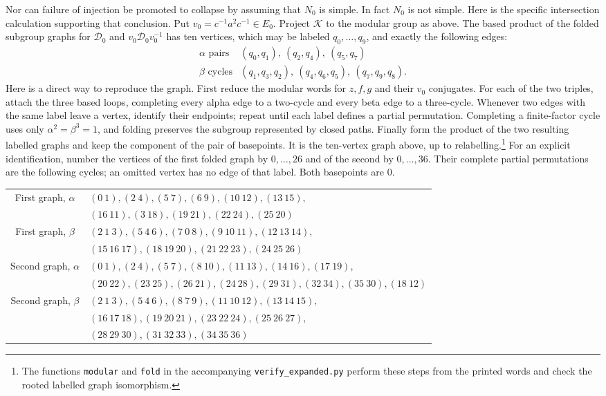 \documentclass[11pt]{amsart}
\theoremstyle{definition}
\theoremstyle{remark}
\begin{document}
Nor can failure of injection be promoted to collapse by assuming that
$N_0$ is simple. In fact $N_0$ is not simple. Here is the specific
intersection calculation supporting that conclusion. Put
$v_0=c^{-1}a^2c^{-1}\in E_0$. Project $\mathcal K$ to the modular
group as above. The based product of the folded subgroup graphs for
$\mathcal D_0$ and $v_0\mathcal D_0v_0^{-1}$ has ten vertices,
which may be labeled $q_0,\ldots,q_9$, and exactly the following edges:
\[
\begin{array}{c|l}
\alpha\text{ pairs}&(q_0,q_1),\ (q_2,q_4),\ (q_5,q_7)\\
\beta\text{ cycles}&(q_1,q_3,q_2),\ (q_4,q_6,q_5),\ (q_7,q_9,q_8).
\end{array}
\]
Here is a direct way to reproduce the graph. First reduce the modular
words for $z,f,g$ and their $v_0$ conjugates. For each of the two
triples, attach the three based loops, completing every alpha edge
to a two-cycle and every beta edge to a three-cycle. Whenever two
edges with the same label leave a vertex, identify their endpoints;
repeat until each label defines a partial permutation. Completing a
finite-factor cycle uses only $\alpha^2=\beta^3=1$, and folding
preserves the subgroup represented by closed paths. Finally form the
product of the two resulting labelled graphs and keep the component
of the pair of basepoints. It is the ten-vertex graph above, up to
relabelling.\footnote{The functions \texttt{modular} and \texttt{fold}
in the accompanying \texttt{verify\_expanded.py} perform these steps
from the printed words and check the rooted labelled graph isomorphism.}
For an explicit identification, number the vertices of the first folded
graph by $0,\ldots,26$ and of the second by $0,\ldots,36$.
Their complete partial permutations are the following cycles; an omitted
vertex has no edge of that label. Both basepoints are $0$.
\begin{center}
\begin{adjustbox}{max width=\textwidth}
\begin{tabular}{cl}
\toprule
First graph, $\alpha$&$(0\ 1),(2\ 4),(5\ 7),(6\ 9),(10\ 12),(13\ 15),$\\
&$(16\ 11),(3\ 18),(19\ 21),(22\ 24),(25\ 20)$\\
First graph, $\beta$&$(2\ 1\ 3),(5\ 4\ 6),(7\ 0\ 8),(9\ 10\ 11),(12\ 13\ 14),$\\
&$(15\ 16\ 17),(18\ 19\ 20),(21\ 22\ 23),(24\ 25\ 26)$\\
Second graph, $\alpha$&$(0\ 1),(2\ 4),(5\ 7),(8\ 10),(11\ 13),(14\ 16),(17\ 19),$\\
&$(20\ 22),(23\ 25),(26\ 21),(24\ 28),(29\ 31),(32\ 34),(35\ 30),(18\ 12)$\\
Second graph, $\beta$&$(2\ 1\ 3),(5\ 4\ 6),(8\ 7\ 9),(11\ 10\ 12),(13\ 14\ 15),$\\
&$(16\ 17\ 18),(19\ 20\ 21),(23\ 22\ 24),(25\ 26\ 27),$\\
&$(28\ 29\ 30),(31\ 32\ 33),(34\ 35\ 36)$\\\bottomrule
\end{tabular}
\end{adjustbox}
\end{center}
\end{document}
